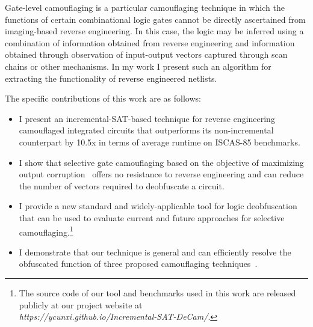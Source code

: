 \documentclass[thesis]{umassthesis}  %
\begin{document}
    Gate-level camouflaging is a particular camouflaging technique in which the functions of certain combinational logic gates cannot be directly ascertained from imaging-based reverse engineering. In this case, the logic may be inferred using a combination of information obtained from reverse engineering and information obtained through observation of input-output vectors captured through scan chains or other mechanisms. In my work I present such an algorithm for extracting the functionality of reverse engineered netlists.

The specific contributions of this work are as follows:

\begin{itemize}


\item {I present an incremental-SAT-based technique for reverse engineering camouflaged integrated circuits that outperforms its non-incremental counterpart by 10.5x in terms of average runtime on ISCAS-85 benchmarks.}

\item I show that selective gate camouflaging based on the objective of maximizing output corruption~\cite{rajendran-13} offers no resistance to reverse engineering and can reduce the number of vectors required to deobfuscate a circuit.


\item I provide a new standard and widely-applicable tool for logic deobfuscation that can be used to evaluate current and future approaches for selective camouflaging.\footnote{The source code of our tool and benchmarks used in this work are released publicly at our project website at \\{\it https://ycunxi.github.io/Incremental-SAT-DeCam/}.}

\item I demonstrate that our technique is general and can efficiently resolve the obfuscated function of three proposed camouflaging techniques~\cite{rajendran-13,malik-obfusgate,chen-2015-dummyWire}.

\end{itemize}
\end{document}
